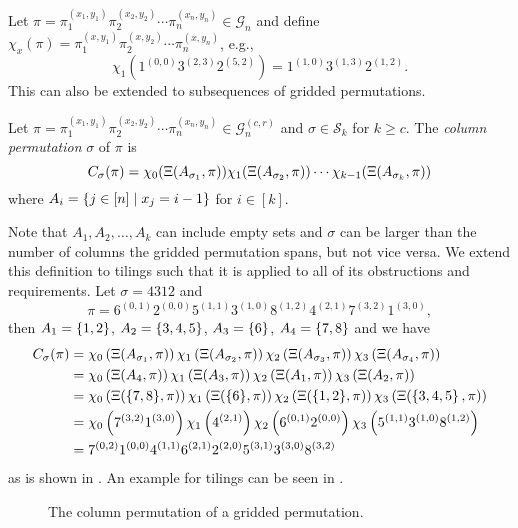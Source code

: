Let $\pi=\pi_1^{(x_1,y_1)}\pi_2^{(x_2,y_2)}\dotsm\pi_n^{(x_n,y_n)} \in \mathcal{G}_n$ and define $\chi_x(\pi) = \pi_1^{(x,y_1)}\pi_2^{(x,y_2)}\dotsm\pi_n^{(x,y_n)}$, e.g.,
\[
\chi_{1}\left(1^{(0,0)}3^{(2,3)}2^{(5,2)}\right) = 1^{(1,0)}3^{(1,3)}2^{(1,2)}.
\]
This can also be extended to subsequences of gridded permutations.

\begin{definition}
Let $\pi = \pi_1^{(x_1,y_1)}\pi_2^{(x_2,y_2)}\dotsm\pi_n^{(x_n,y_n)} \in \mathcal{G}_n^{(c,r)}$ and $\sigma \in \mathcal{S}_k$ for $k \geq c$. The \emph{column permutation} $\sigma$ of $\pi$ is 
\[
    C_\sigma(\pi) = \chi_0(\Xi(A_{\sigma_1},\pi))\chi_1(\Xi(A_{\sigma_2},\pi)) \dotsm \chi_{k-1}(\Xi(A_{\sigma_k},\pi))
\]
where $A_i = \left\{j \in [n] \mid x_j = i - 1\right\}$ for $i \in [k]$.
\end{definition}

Note that $A_1,A_2,\dotsc,A_k$ can include empty sets and $\sigma$ can be larger than the number of columns the gridded permutation spans, but not vice versa. We extend this definition to tilings such that it is applied to all of its obstructions and requirements. Let $\sigma = 4312$ and
\[
\pi = 6^{(0,1)}2^{(0,0)}5^{(1,1)}3^{(1,0)}8^{(1,2)}4^{(2,1)}7^{(3,2)}1^{(3,0)},
\]
then $A_1=\left\{1,2\right\}$, $A_2=\left\{3,4,5\right\}$, $A_3=\left\{6\right\}$, $A_4=\left\{7,8\right\}$ and we have
\begin{align*}
    C_\sigma(\pi) &= \chi_0\left(\Xi(A_{\sigma_1},\pi)\right)\chi_1\left(\Xi(A_{\sigma_2},\pi)\right)\chi_2\left(\Xi(A_{\sigma_3},\pi)\right) \chi_3\left(\Xi(A_{\sigma_{4}},\pi)\right) \\
    &= \chi_0\left(\Xi(A_{4},\pi)\right)\chi_1\left(\Xi(A_{3},\pi)\right)\chi_2\left(\Xi(A_{1},\pi)\right)\chi_3\left(\Xi(A_{2},\pi)\right) \\
    &= \chi_0\left(\Xi({\left\{7,8\right\}},\pi)\right) \chi_1\left(\Xi({\left\{6\right\}},\pi)\right)\chi_2\left(\Xi({\left\{1,2\right\}},\pi)\right)\chi_3\left(\Xi(\left\{3,4,5\right\},\pi)\right) \\
    &= \chi_0\left(7^{(3,2)}1^{(3,0)}\right)\chi_1\left(4^{(2,1)}\right)\chi_2\left(6^{(0,1)}2^{(0,0)}\right)\chi_3\left(5^{(1,1)}3^{(1,0)}8^{(1,2)}\right) \\
    &= 7^{(0,2)}1^{(0,0)}4^{(1,1)}6^{(2,1)}2^{(2,0)}5^{(3,1)}3^{(3,0)}8^{(3,2)}
\end{align*}
as is shown in . An example for tilings can be seen in .

\begin{figure}[H]
    \centering
    
    \caption{The column permutation of a gridded permutation.}
    \label{fig:gp_col_perm}
\end{figure}


